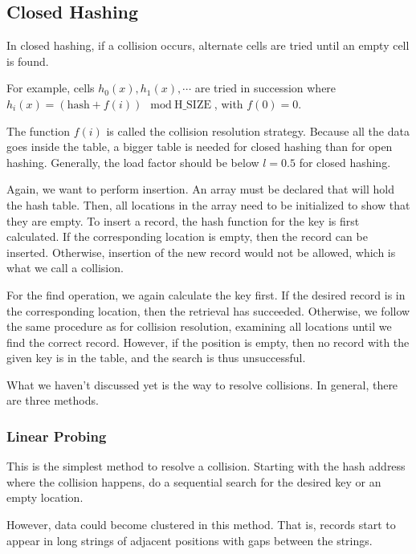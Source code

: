 \subsection{Closed Hashing}
In closed hashing, if a collision occurs, alternate cells are tried until an empty cell is found.

For example, cells \(h_0(x), h_1(x), \cdots\) are tried in succession where \(h_i(x) = (\text{hash} + f(i)) \mod \text{H\_SIZE}\), with \(f(0) = 0\).

The function \(f(i)\) is called the collision resolution strategy. Because all the data goes inside the table, a bigger table is needed for closed hashing than for open hashing. Generally, the load factor should be below \(l = 0.5\) for closed hashing.

Again, we want to perform insertion. An array must be declared that will hold the hash table. Then, all locations in the array need to be initialized to show that they are empty. To insert a record, the hash function for the key is first calculated. If the corresponding location is empty, then the record can be inserted. Otherwise, insertion of the new record would not be allowed, which is what we call a collision.

For the find operation, we again calculate the key first. If the desired record is in the corresponding location, then the retrieval has succeeded. Otherwise, we follow the same procedure as for collision resolution, examining all locations until we find the correct record. However, if the position is empty, then no record with the given key is in the table, and the search is thus unsuccessful.

What we haven't discussed yet is the way to resolve collisions. In general, there are three methods.

\subsubsection{Linear Probing}
This is the simplest method to resolve a collision. Starting with the hash address where the collision happens, do a sequential search for the desired key or an empty location. 

However, data could become clustered in this method. That is, records start to appear in long strings of adjacent positions with gaps between the strings.

